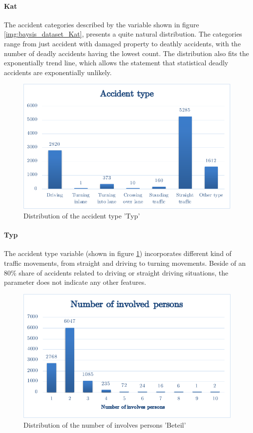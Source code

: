 \documentclass[a4paper,12pt]{report}
\begin{document}
\paragraph{Kat}
The accident categories described by the variable shown in figure \ref{img:baysis_dataset_Kat}, presents a quite natural distribution. The categories range from just accident with damaged property to deathly accidents, with the number of deadly accidents having the lowest count. The distribution also fits the exponentially trend line, which allows the statement that statistical deadly accidents are exponentially unlikely.

\begin{figure}[h]
	\centering
	\includegraphics[scale=0.6]{./assets/baysis_dataset_Typ.pdf}
	\caption{Distribution of the accident type 'Typ'}
	\label{img:baysis_dataset_Typ}
\end{figure}

\paragraph{Typ}
The accident type variable (shown in figure \ref{img:baysis_dataset_Typ}) incorporates different kind of traffic movements, from straight and driving to turning movements. Beside of an 80\% share of accidents related to driving or straight driving situations, the parameter does not indicate any other features.

\begin{figure}[H]
	\centering
	\includegraphics[scale=0.6]{./assets/baysis_dataset_Beteil.pdf}
	\caption{Distribution of the number of involves persons 'Beteil'}
	\label{img:baysis_dataset_Beteil}
\end{figure}
\end{document}
